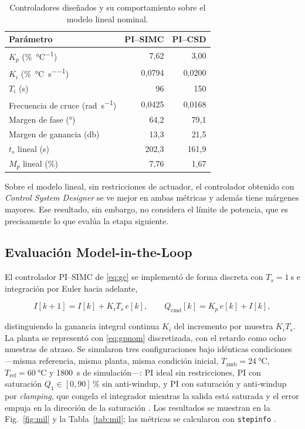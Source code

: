 \documentclass[conference,a4paper,10pt]{IEEEtran}
\newcommand{\Tref}{T_{\mathrm{ref}}}
\newcommand{\Tamb}{T_{\mathrm{amb}}}
\newcommand{\Qcmd}{Q_{\mathrm{cmd}}}
\newcommand{\Kp}{K_p}
\newcommand{\Ki}{K_i}
\newcommand{\Ti}{T_i}
\begin{document}
\begin{table}[!t]
\caption{Controladores diseñados y su comportamiento sobre el modelo lineal nominal.}
\label{tab:controladores}
\centering
\footnotesize
\begin{tabular}{@{}lrr@{}}
\toprule
\textbf{Parámetro} & \textbf{PI--SIMC} & \textbf{PI--CSD} \\
\midrule
$\Kp$ (\si{\percent\per\celsius})                & 7,62   & 3,00 \\
$\Ki$ (\si{\percent\per\celsius\per\second})    & 0,0794 & 0,0200 \\
$\Ti$ (\si{\second})                             & 96     & 150 \\
\midrule
Frecuencia de cruce (\si{\radian\per\second})    & 0,0425 & 0,0168 \\
Margen de fase (\si{\degree})                     & 64,2   & 79,1 \\
Margen de ganancia (\si{\decibel})                & 13,3   & 21,5 \\
\midrule
$t_s$ lineal (\si{\second})                       & 202,3  & 161,9 \\
$M_p$ lineal (\si{\percent})                      & 7,76   & 1,67 \\
\bottomrule
\end{tabular}
\end{table}

Sobre el modelo lineal, sin restricciones de actuador, el controlador obtenido con
\emph{Control System Designer} se ve mejor en ambas métricas y además tiene márgenes mayores. Ese
resultado, sin embargo, no considera el límite de potencia, que es precisamente lo que evalúa la
etapa siguiente.

\subsection{Evaluación Model-in-the-Loop}

El controlador PI--SIMC de \eqref{eq:gc} se implementó de forma discreta con $T_s = \SI{1}{\second}$ e
integración por Euler hacia adelante,

\begin{equation}
I[k+1] = I[k] + \Ki T_s\, e[k],
\qquad
\Qcmd[k] = \Kp\, e[k] + I[k],
\label{eq:pidiscreto}
\end{equation}

distinguiendo la ganancia integral continua $\Ki$ del incremento por muestra $\Ki T_s$. La planta se
representó con \eqref{eq:gpnom} discretizada, con el retardo como ocho muestras de atraso. Se
simularon tres configuraciones bajo idénticas condiciones ---misma referencia, misma planta, misma
condición inicial, $\Tamb = \SI{24}{\celsius}$, $\Tref = \SI{60}{\celsius}$ y
\SI{1800}{\second} de simulación---: PI ideal sin restricciones, PI con saturación
$Q_1 \in [0,90]\,\si{\percent}$ sin anti-windup, y PI con saturación y anti-windup por
\emph{clamping}, que congela el integrador mientras la salida está saturada y el error empuja en
la dirección de la saturación \cite{mw_antiwindup}. Los resultados se muestran en la
Fig.~\ref{fig:mil} y la Tabla~\ref{tab:mil}; las métricas se calcularon con \texttt{stepinfo}
\cite{mw_stepinfo}.
\end{document}
